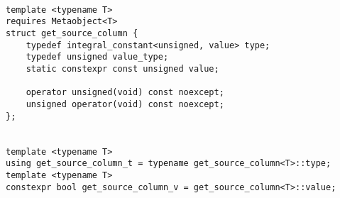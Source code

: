 \begin{verbatim}

template <typename T>
requires Metaobject<T>
struct get_source_column {
	typedef integral_constant<unsigned, value> type;
	typedef unsigned value_type;
	static constexpr const unsigned value;

	operator unsigned(void) const noexcept;
	unsigned operator(void) const noexcept;
};


template <typename T>
using get_source_column_t = typename get_source_column<T>::type;
template <typename T>
constexpr bool get_source_column_v = get_source_column<T>::value;

\end{verbatim}
